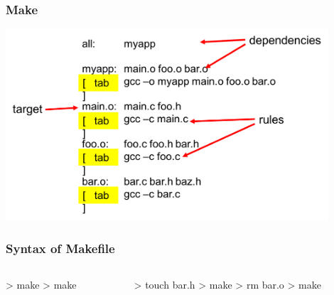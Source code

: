 \documentclass[newPxFont,sthlmFooter,nooffset]{beamer}
\begin{document}
\begin{frame}[t]
  \frametitle{Make}

  \begin{center}
    \includegraphics[width=0.9\textwidth]{figures/fig02_structure.png}
  \end{center}

\end{frame}

\begin{frame}[t, fragile]
  \frametitle{Syntax of Makefile}
\begin{columns}
\begin{column}{0.3\textwidth}

\end{column}
\begin{column}{0.3\textwidth}

\end{column}
\begin{column}{0.3\textwidth}

\end{column}
\end{columns}

\begin{columns}
\begin{column}{0.4\textwidth}
\begin{codedefnb}
> make
> make
\end{codedefnb}
\end{column}
\begin{column}{0.4\textwidth}
\begin{codedefnb}
> touch bar.h
> make
> rm bar.o
> make
\end{codedefnb}
\end{column}
\end{columns}


\end{frame}
\end{document}
